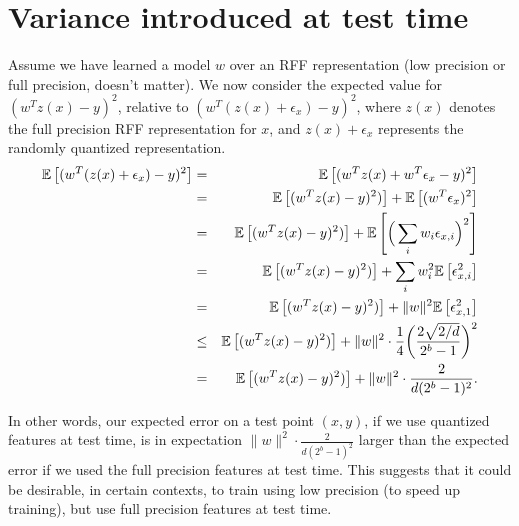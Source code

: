 \documentclass[12pt]{article}
\newcommand{\eps}{\epsilon}
\begin{document}
\section{Variance introduced at test time}
Assume we have learned a model $w$ over an RFF representation (low precision or full precision, doesn't matter).  We now consider the expected value for $(w^T z(x) - y)^2$, relative to $(w^T (z(x) + \eps_x) -y)^2$, where $z(x)$ denotes the full precision RFF representation for $x$, and $z(x) + \eps_x$ represents the randomly quantized representation.
\begin{eqnarray*}
	\expect{}{(w^T (z(x) + \eps_x) -y)^2} &=& \expect{}{(w^T z(x) + w^T \eps_x -y)^2} \\
	&=& \expect{}{(w^T z(x) - y)^2)} + \expect{}{(w^T \eps_x)^2} \\
	&=& \expect{}{(w^T z(x) - y)^2)} + \expect{}{\Big(\sum_i w_i \eps_{x,i}\Big)^2} \\
	&=& \expect{}{(w^T z(x) - y)^2)} + \sum_i w_i^2 \expect{}{\eps_{x,i}^2} \\
	&=& \expect{}{(w^T z(x) - y)^2)} + \|w\|^2\expect{}{\eps_{x,1}^2} \\
	&\leq& \expect{}{(w^T z(x) - y)^2)} + \|w\|^2\cdot\frac{1}{4}\bigg(\frac{2\sqrt{2/d}}{2^b-1}\bigg)^2\\
	&=& \expect{}{(w^T z(x) - y)^2)} + \|w\|^2\cdot\frac{2}{d(2^b-1)^2}.
\end{eqnarray*}

In other words, our expected error on a test point $(x,y)$, if we use quantized features at test time, is in expectation $\|w\|^2\cdot\frac{2}{d(2^b-1)^2}$ larger than the expected error if we used the full precision features at test time.  This suggests that it could be desirable, in certain contexts, to train using low precision (to speed up training), but use full precision features at test time.
\end{document}
